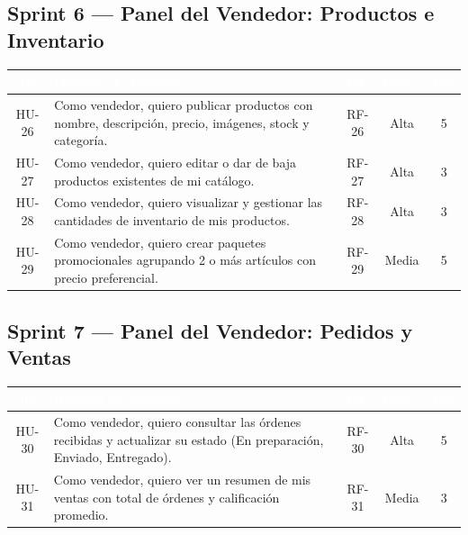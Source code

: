 \documentclass[12pt,a4paper]{article}
\begin{document}
\subsection{Sprint 6 --- Panel del Vendedor: Productos e Inventario}
\begin{longtable}{|c|p{8cm}|c|c|c|}
\hline
\rowcolor{darkbg}\textcolor{white}{\textbf{ID}} & \textcolor{white}{\textbf{Historia de Usuario}} & \textcolor{white}{\textbf{RF}} & \textcolor{white}{\textbf{Prior.}} & \textcolor{white}{\textbf{Pts}} \\
\hline
HU-26 & Como vendedor, quiero publicar productos con nombre, descripción, precio, imágenes, stock y categoría. & RF-26 & Alta & 5 \\
\hline
HU-27 & Como vendedor, quiero editar o dar de baja productos existentes de mi catálogo. & RF-27 & Alta & 3 \\
\hline
HU-28 & Como vendedor, quiero visualizar y gestionar las cantidades de inventario de mis productos. & RF-28 & Alta & 3 \\
\hline
HU-29 & Como vendedor, quiero crear paquetes promocionales agrupando 2 o más artículos con precio preferencial. & RF-29 & Media & 5 \\
\hline
\end{longtable}

\subsection{Sprint 7 --- Panel del Vendedor: Pedidos y Ventas}
\begin{longtable}{|c|p{8cm}|c|c|c|}
\hline
\rowcolor{darkbg}\textcolor{white}{\textbf{ID}} & \textcolor{white}{\textbf{Historia de Usuario}} & \textcolor{white}{\textbf{RF}} & \textcolor{white}{\textbf{Prior.}} & \textcolor{white}{\textbf{Pts}} \\
\hline
HU-30 & Como vendedor, quiero consultar las órdenes recibidas y actualizar su estado (En preparación, Enviado, Entregado). & RF-30 & Alta & 5 \\
\hline
HU-31 & Como vendedor, quiero ver un resumen de mis ventas con total de órdenes y calificación promedio. & RF-31 & Media & 3 \\
\hline
\end{longtable}

\end{document}
